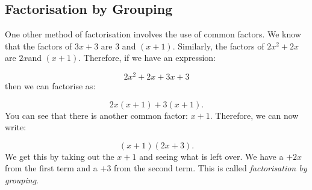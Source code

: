 \begin{exercises}{}
{%

\end{exercises}


            \subsection{ Factorisation by Grouping}
            \nopagebreak
      \label{m39394*id278358}One other method of factorisation involves the use of common factors. We know that the factors of $3x+3$\hspace{1ex} are 3 and $\left(x+1\right)$. Similarly, the factors of $2{x}^{2}+2x$\hspace{1ex}are $2x$\hspace{1ex}and $\left(x+1\right)$. Therefore, if we have an expression:\par 
      \label{m39394*id278452}\nopagebreak\noindent{}
        
    \begin{equation}
    2{x}^{2}+2x+3x+3
      \end{equation}
      \label{m39394*id278488}then we can factorise as:\par 
      \label{m39394*id278494}\nopagebreak\noindent{}
        
    \begin{equation}
    2x\left(x+1\right)+3\left(x+1\right).
      \end{equation}
      \label{m39394*id278536}You can see that there is another common factor: $x+1$. Therefore, we can now write:\par 
      \label{m39394*id278556}\nopagebreak\noindent{}
        
    \begin{equation}
    \left(x+1\right)\left(2x+3\right).
      \end{equation}
      \label{m39394*id278591}We get this by taking out the $x+1$ and seeing what is left over. We have a $+2x$\hspace{1ex}from the first term and a $+3$ from the second term. This is called \textsl{factorisation by grouping}.\par 
\label{m39394*secfhsst!!!underscore!!!id2835}\vspace{.5cm} 
      \noindent
     

